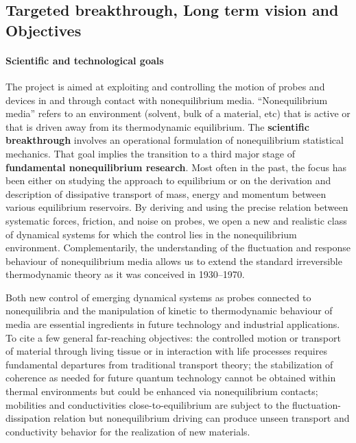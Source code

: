 \subsection{Targeted breakthrough, Long term vision and Objectives}\label{sec:objectives}


\paragraph{Scientific and technological goals}

The project is aimed at exploiting and controlling the motion of probes and devices in and
through contact with nonequilibrium media. ``Nonequilibrium media'' refers to an environment
(solvent, bulk of a material, etc) that is active or that is driven away from its
thermodynamic equilibrium.
%
The {\bf scientific
  breakthrough} involves an operational formulation of nonequilibrium statistical mechanics.
That goal implies the transition to a third major stage of {\bf fundamental nonequilibrium
  research}. Most often in the past, the focus has been either on studying the approach to equilibrium or on
the derivation and description of dissipative transport of mass, energy and momentum between
various equilibrium reservoirs.  By deriving and using the precise relation between
systematic forces, friction, and noise on probes, we open a new and realistic class of
dynamical systems for which the control lies in the nonequilibrium environment.
Complementarily, the understanding of the fluctuation and response behaviour of nonequilibrium
media allows us to extend the standard irreversible thermodynamic theory as it was conceived in
1930--1970.

Both new control of emerging dynamical systems as probes connected to nonequilibria and the 
manipulation of kinetic to thermodynamic behaviour of media are essential
ingredients in future technology and industrial applications.  To cite a few general
far-reaching objectives: the controlled motion or transport of material through living
tissue or in interaction with life processes requires fundamental departures from
traditional transport theory; the stabilization of coherence as needed for future quantum
technology cannot be obtained within thermal environments but could be enhanced via
nonequilibrium contacts; mobilities and conductivities close-to-equilibrium are subject to
the fluctuation-dissipation relation but nonequilibrium driving can produce unseen transport
and conductivity behavior for the realization of new materials. 


